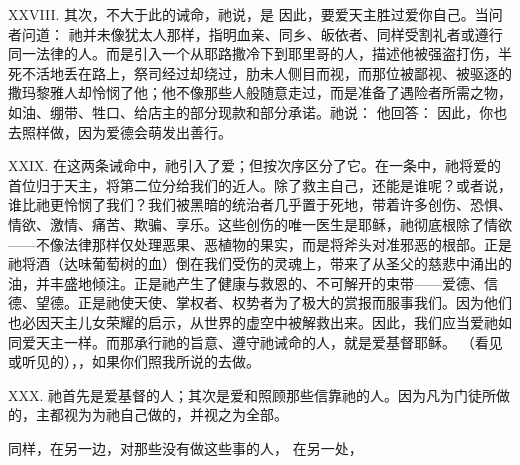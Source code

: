 XXVIII. 其次，不大于此的诫命，祂说，是  因此，要爱天主胜过爱你自己。当问者问道：  祂并未像犹太人那样，指明血亲、同乡、皈依者、同样受割礼者或遵行同一法律的人。而是引入一个从耶路撒冷下到耶里哥的人，描述他被强盗打伤，半死不活地丢在路上，祭司经过却绕过，肋未人侧目而视，而那位被鄙视、被驱逐的撒玛黎雅人却怜悯了他；他不像那些人般随意走过，而是准备了遇险者所需之物，如油、绷带、牲口、给店主的部分现款和部分承诺。祂说： 他回答：  因此，你也去照样做，因为爱德会萌发出善行。\par

XXIX. 在这两条诫命中，祂引入了爱；但按次序区分了它。在一条中，祂将爱的首位归于天主，将第二位分给我们的近人。除了救主自己，还能是谁呢？或者说，谁比祂更怜悯了我们？我们被黑暗的统治者几乎置于死地，带着许多创伤、恐惧、情欲、激情、痛苦、欺骗、享乐。这些创伤的唯一医生是耶稣，祂彻底根除了情欲——不像法律那样仅处理恶果、恶植物的果实，而是将斧头对准邪恶的根部。正是祂将酒（达味葡萄树的血）倒在我们受伤的灵魂上，带来了从圣父的慈悲中涌出的油，并丰盛地倾注。正是祂产生了健康与救恩的、不可解开的束带——爱德、信德、望德。正是祂使天使、掌权者、权势者为了极大的赏报而服事我们。因为他们也必因天主儿女荣耀的启示，从世界的虚空中被解救出来。因此，我们应当爱祂如同爱天主一样。而那承行祂的旨意、遵守祂诫命的人，就是爱基督耶稣。  （看见或听见的），，如果你们照我所说的去做。\par

XXX. 祂首先是爱基督的人；其次是爱和照顾那些信靠祂的人。因为凡为门徒所做的，主都视为为祂自己做的，并视之为全部。\par

同样，在另一边，对那些没有做这些事的人， 在另一处，\par

